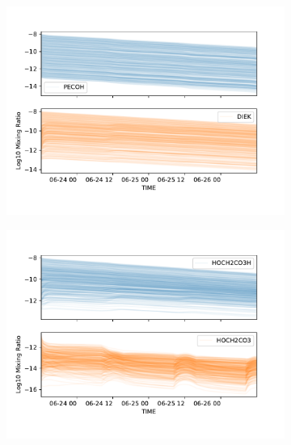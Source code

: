 \begin{figure}[H]
\begin{subfigure}[t]{.5\textwidth}
  \centering
  \includegraphics[width=\textwidth]{ensemble/PECOH-DIEK.pdf}
\end{subfigure}%
\begin{subfigure}[t]{.5\textwidth}
  \centering
  \includegraphics[width=\textwidth]{ensemble/HOCH2CO3H-HOCH2CO3.pdf}
\end{subfigure}%


\end{figure}
